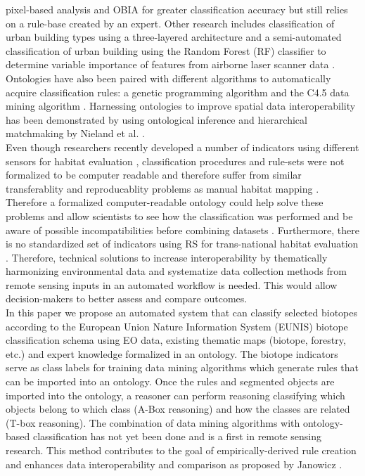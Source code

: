 \documentclass[authoryear, review,12pt,number]{elsarticle}
\begin{document}
pixel-based analysis and OBIA for greater classification accuracy but still
relies on a rule-base created by an expert. Other research includes
classification of urban building types using a three-layered architecture
\citep{diSciascio2013} and a semi-automated classification of urban building
using the Random Forest (RF) classifier to determine variable importance of
features from airborne laser scanner data \citep{Belgiu2014}. Ontologies have
also been paired with different algorithms to automatically acquire
classification rules: a genetic programming algorithm
\citep{Forestier2012470} and the C4.5 data mining algorithm
\citep{Sheeren2006ML}. Harnessing ontologies to improve spatial data
interoperability has been demonstrated by using ontological inference and
hierarchical matchmaking by Nieland et al. \citep{Nieland2015}. 
\\
Even though researchers recently developed a number of indicators using
different sensors for habitat evaluation \citep{Nagendra2013}, classification
procedures and rule-sets were not formalized to be computer readable and
therefore suffer from similar transferablity and reproducablity problems as
manual habitat mapping \citep{Arvor2013, Nieland2015}.
Therefore a formalized computer-readable ontology could help solve these
problems and allow scientists to see how the classification was performed and 
be aware of possible incompatibilities before combining datasets
\citep{Janowicz2012}. 
Furthermore, there is no standardized set of indicators
using RS for trans-national habitat evaluation \citep{Lucas2015}. Therefore,
technical solutions to increase interoperability by thematically harmonizing
environmental data and systematize data collection methods from remote sensing
inputs in an automated workflow is needed. This would allow decision-makers 
to better assess and compare outcomes.
\\
In this paper we propose an automated system that can
classify selected biotopes according to the European Union Nature Information
System (EUNIS) biotope classification schema using EO data, existing
thematic maps (biotope, forestry, etc.) and expert knowledge formalized in an
ontology. The biotope indicators serve as class labels for training data mining
algorithms which generate rules that can be imported into an ontology. Once the
rules and segmented objects are imported into the ontology, a reasoner can
perform reasoning classifying which objects belong to which class (A-Box 
reasoning) and how the classes are related (T-box reasoning). The combination 
of data mining algorithms with ontology-based classification has not yet been 
done and is a first in remote sensing research. This method contributes to the 
goal of empirically-derived rule creation and enhances data interoperability and 
comparison as proposed by Janowicz \citep{Janowicz2012}.
\end{document}
